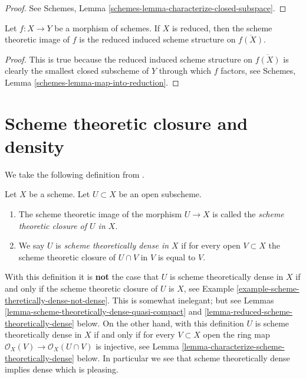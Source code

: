 \begin{proof}
See Schemes, Lemma \ref{schemes-lemma-characterize-closed-subspace}.
\end{proof}

\begin{lemma}
\label{lemma-scheme-theoretic-image-reduced}
Let $f : X \to Y$ be a morphism of schemes.
If $X$ is reduced, then the scheme theoretic image of $f$ is
the reduced induced scheme structure on $\overline{f(X)}$.
\end{lemma}

\begin{proof}
This is true because the reduced induced scheme structure on $\overline{f(X)}$
is clearly the smallest closed subscheme of $Y$ through which $f$ factors,
see
Schemes, Lemma \ref{schemes-lemma-map-into-reduction}.
\end{proof}




\section{Scheme theoretic closure and density}
\label{section-scheme-theoretic-closure}

\noindent
We take the following definition from \cite[IV, Definition 11.10.2]{EGA}.

\begin{definition}
\label{definition-scheme-theoretically-dense}
Let $X$ be a scheme. Let $U \subset X$ be an open subscheme.
\begin{enumerate}
\item The scheme theoretic image of the morphism $U \to X$
is called the {\it scheme theoretic closure of $U$ in $X$}.
\item We say $U$ is {\it scheme theoretically dense in $X$}
if for every open $V \subset X$ the scheme theoretic closure
of $U \cap V$ in $V$ is equal to $V$.
\end{enumerate}
\end{definition}

\noindent
With this definition it is
{\bf not} the case that $U$ is scheme theoretically dense in $X$ if and
only if the scheme theoretic closure of $U$ is $X$, see
Example \ref{example-scheme-theretically-dense-not-dense}.
This is somewhat inelegant; but see
Lemmas \ref{lemma-scheme-theoretically-dense-quasi-compact} and
\ref{lemma-reduced-scheme-theoretically-dense}
below. On the other hand, with this definition $U$ is scheme theoretically
dense in $X$ if and only if for every $V \subset X$ open the ring map
$\mathcal{O}_X(V) \to \mathcal{O}_X(U \cap V)$ is injective, see
Lemma \ref{lemma-characterize-scheme-theoretically-dense}
below. In particular we see that scheme theoretically dense implies dense
which is pleasing.

